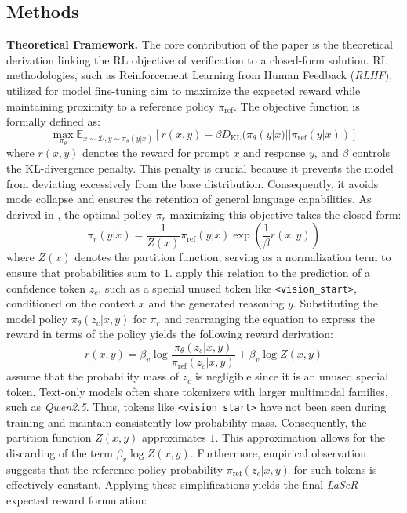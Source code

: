 \documentclass[a4paper,oneside,10pt,ngerman,english]{scrartcl}
\begin{document}
\subsection{Methods}
\textbf{Theoretical Framework.} The core contribution of the paper is the theoretical derivation linking the RL objective of verification to a closed-form solution. RL methodologies, such as Reinforcement Learning from Human Feedback (\textit{RLHF}), utilized for model fine-tuning aim to maximize the expected reward while maintaining proximity to a reference policy $\pi_{\text{ref}}$. The objective function is formally defined as:
\begin{equation}
	\max_{\pi_\theta} \mathbb{E}_{x \sim \mathcal{D}, y \sim \pi_\theta(y|x)} \left[ r(x, y) - \beta D_{\text{KL}}(\pi_\theta(y|x) || \pi_{\text{ref}}(y|x)) \right]
\end{equation}
where $r(x, y)$ denotes the reward for prompt $x$ and response $y$, and $\beta$ controls the KL-divergence penalty. This penalty is crucial because it prevents the model from deviating excessively from the base distribution. Consequently, it avoids mode collapse and ensures the retention of general language capabilities. As derived in \citet{directpreferenceopt}, the optimal policy $\pi_r$ maximizing this objective takes the closed form:
\begin{equation}
	\pi_r(y | x) = \frac{1}{Z(x)} \pi_{\text{ref}}(y | x) \exp\left(\frac{1}{\beta} r(x, y)\right)
\end{equation}
where $Z(x)$ denotes the partition function, serving as a normalization term to ensure that probabilities sum to $1$. \citet{laser} apply this relation to the prediction of a confidence token $z_c$, such as a special unused token like \texttt{<vision\_start>}, conditioned on the context $x$ and the generated reasoning $y$. Substituting the model policy $\pi_\theta(z_c | x, y)$ for $\pi_r$ and rearranging the equation to express the reward in terms of the policy yields the following reward derivation:
\begin{equation}
	r(x, y) = \beta_v \log \frac{\pi_\theta(z_c | x, y)}{\pi_{\text{ref}}(z_c | x, y)} + \beta_v \log Z(x, y)
\end{equation}
\citet{laser} assume that the probability mass of $z_c$ is negligible since it is an unused special token. Text-only models often share tokenizers with larger multimodal families, such as \textit{Qwen2.5}. Thus, tokens like \texttt{<vision\_start>} have not been seen during training and maintain consistently low probability mass. Consequently, the partition function $Z(x, y)$ approximates $1$. This approximation allows for the discarding of the term $\beta_v \log Z(x, y)$. Furthermore, empirical observation suggests that the reference policy probability $\pi_{\text{ref}}(z_c | x, y)$ for such tokens is effectively constant. Applying these simplifications yields the final \textit{LaSeR} expected reward formulation:
\end{document}
